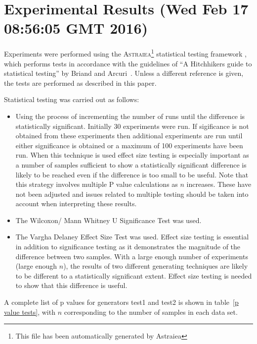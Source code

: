 \documentclass[]{article}
\begin{document}
\section{Experimental Results (Wed Feb 17 08:56:05 GMT 2016)}
Experiments were performed using the \textsc{Astraiea}\footnote{This file has been automatically generated by Astraiea} statistical testing framework \cite{Neumann:2014:EET:2598394.2609850},
which performs tests in accordance with the guidelines of ``A Hitchhikers guide to statistical testing''
by Briand and Arcuri~\cite{Arcuri2012}.
Unless a different reference is given, the tests are performed as described in this paper.



Statistical testing was carried out as follows: 
\begin{itemize}
\item{Using the process of incrementing the number of runs until the difference is statistically significant. Initially 30 experiments were run. If sigificance is not obtained from these experiments then additional experiments are run until either significance is obtained or a maximum of 100 experiments have been run. When this technique is used effect size testing is especially important as a number of samples sufficient to show a statistically significant difference is likely to be reached even if the difference is too small to be useful. Note that this strategy involves multiple P value calculations as $n$ increases. These have not been adjusted and issues related to multiple testing should be taken into account when interpreting these results.
}
\item{The Wilcoxon/ Mann Whitney U Significance Test was used.}
\item{The Vargha Delaney Effect Size Test was used. Effect size testing is essential in addition to significance testing as it demonstrates the magnitude of the difference between two samples. With a large enough number of experiments (large enough $n$), the results of two different generating techniques are likely to be different to a statistically significant extent. Effect size testing is needed to show that this difference is useful.}
\end{itemize}A complete list of p values for generators test1 and test2 is shown in table~\ref{p value tests}, with $n$ corresponding to the number of samples in each data set.
\end{document}
